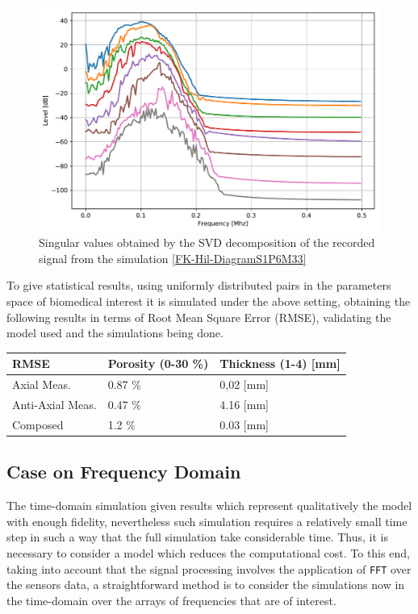 \begin{figure}[!h]  
	\centering
	\includegraphics[scale=.5]{images/TimeSingSous/2DTimeHilb_P6Elastic33_SV.pdf}
	\caption{Singular values obtained by the SVD decomposition of the recorded signal from the simulation \ref{FK-Hil-DiagramS1P6M33}}
	\label{SVD-Hil-S1P7M33}
\end{figure}

To give statistical results, using uniformly distributed pairs in the parameters space of biomedical interest it is simulated under the above setting, obtaining the following results in terms of Root Mean Square Error (RMSE), validating the model used and the simulations being done.

\begin{center}
\vspace{2ex}
\begin{tabular}{l l l}
\toprule
\textbf{RMSE} & \textbf{Porosity} (0-30 \%) & \textbf{Thickness} (1-4) [mm]\\
\midrule
Axial Meas. & 0.87 \% & 0,02  [mm]\\
Anti-Axial Meas. & 0.47 \%  & 4.16 [mm]\\
Composed & 1.2 \% & 0.03 [mm] \\
\bottomrule
\end{tabular}
\end{center}


\subsection{Case on Frequency Domain}

The time-domain simulation given results which represent qualitatively the model with enough fidelity, nevertheless such simulation requires a relatively small time step in such a way that the full simulation take considerable time. Thus, it is necessary to consider a model which reduces the computational cost.
To this end, taking into account that the signal processing involves the application of \texttt{FFT} over the sensors data, a straightforward method is to consider the simulations now in the time-domain over the arrays of frequencies that are of interest.


